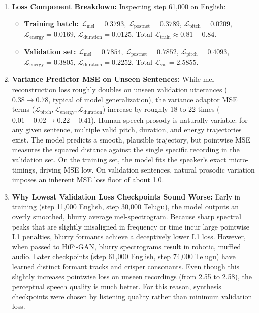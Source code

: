 \documentclass[11pt,a4paper]{report}
\begin{document}
\begin{enumerate}
    \item \textbf{Loss Component Breakdown:} Inspecting step 61{,}000 on English:
    \begin{itemize}
        \item \textbf{Training batch:} $\mathcal{L}_{\text{mel}} = 0.3793$, $\mathcal{L}_{\text{postnet}} = 0.3789$, $\mathcal{L}_{\text{pitch}} = 0.0209$, $\mathcal{L}_{\text{energy}} = 0.0169$, $\mathcal{L}_{\text{duration}} = 0.0125$. Total $\mathcal{L}_{\text{train}} \approx 0.81 - 0.84$.
        \item \textbf{Validation set:} $\mathcal{L}_{\text{mel}} = 0.7854$, $\mathcal{L}_{\text{postnet}} = 0.7852$, $\mathcal{L}_{\text{pitch}} = 0.4093$, $\mathcal{L}_{\text{energy}} = 0.3805$, $\mathcal{L}_{\text{duration}} = 0.2252$. Total $\mathcal{L}_{\text{val}} = 2.5855$.
    \end{itemize}
    \item \textbf{Variance Predictor MSE on Unseen Sentences:}
    While mel reconstruction loss roughly doubles on unseen validation utterances ($0.38 \to 0.78$, typical of model generalization), the variance adaptor MSE terms ($\mathcal{L}_{\text{pitch}}, \mathcal{L}_{\text{energy}}, \mathcal{L}_{\text{duration}}$) increase by roughly 18 to 22 times ($0.01-0.02 \to 0.22-0.41$).
    Human speech prosody is naturally variable: for any given sentence, multiple valid pitch, duration, and energy trajectories exist. The model predicts a smooth, plausible trajectory, but pointwise MSE measures the squared distance against the single specific recording in the validation set. On the training set, the model fits the speaker's exact micro-timings, driving MSE low. On validation sentences, natural prosodic variation imposes an inherent MSE loss floor of about 1.0.
    \item \textbf{Why Lowest Validation Loss Checkpoints Sound Worse:}
    Early in training (step 11{,}000 English, step 30{,}000 Telugu), the model outputs an overly smoothed, blurry average mel-spectrogram. Because sharp spectral peaks that are slightly misaligned in frequency or time incur large pointwise L1 penalties, blurry formants achieve a deceptively lower L1 loss. However, when passed to HiFi-GAN, blurry spectrograms result in robotic, muffled audio.
    Later checkpoints (step 61{,}000 English, step 74{,}000 Telugu) have learned distinct formant tracks and crisper consonants. Even though this slightly increases pointwise loss on unseen recordings (from 2.55 to 2.58), the perceptual speech quality is much better. For this reason, synthesis checkpoints were chosen by listening quality rather than minimum validation loss.
\end{enumerate}
\end{document}
